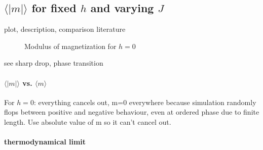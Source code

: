 \documentclass{scrartcl}
\begin{document}
\subsection{$\langle |m|\rangle$ for fixed $h$ and varying $J$}
plot, description, comparison literature

	\begin{figure}[htbp]
		
		\caption{Modulus of magnetization for $h=0$}
		\label{fig:absmag}
	\end{figure}
see sharp drop, phase transition
\paragraph{$\langle |m|\rangle$ vs. $\langle m\rangle$}
For $h=0$: everything cancels out, m=0 everywhere because simulation randomly flops between positive and negative behaviour, even at ordered phase due to finite length.
Use absolute value of m so it can't cancel out.

\paragraph{thermodynamical limit}



\newpage	
\listoffigures
\printbibliography
\end{document}
